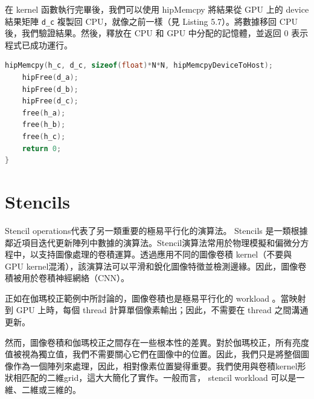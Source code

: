 在 kernel 函數執行完畢後，我們可以使用 hipMemcpy 將結果從 GPU 上的 device 結果矩陣 \texttt{d\_c} 複製回 CPU，就像之前一樣（見 Listing 5.7）。將數據移回 CPU 後，我們驗證結果。然後，釋放在 CPU 和 GPU 中分配的記憶體，並返回 0 表示程式已成功運行。

\lstset{style=mystyle}
\begin{lstlisting}[language=c++,caption={資料傳輸（host到device）和記憶體釋放}]
    hipMemcpy(h_c, d_c, sizeof(float)*N*N, hipMemcpyDeviceToHost);
    hipFree(d_a);
    hipFree(d_b);
    hipFree(d_c);
    free(h_a);
    free(h_b);
    free(h_c);
    return 0;
}
\end{lstlisting}
\section{Stencils}

Stencil operations代表了另一類重要的極易平行化的演算法。 Stencils 是一類根據鄰近項目迭代更新陣列中數據的演算法。Stencil演算法常用於物理模擬和偏微分方程中，以支持圖像處理的卷積運算。透過應用不同的圖像卷積 kernel（不要與 GPU kernel混淆），該演算法可以平滑和銳化圖像特徵並檢測邊緣。因此，圖像卷積被用於卷積神經網絡（CNN）。


正如在伽瑪校正範例中所討論的，圖像卷積也是極易平行化的 workload 。當映射到 GPU 上時，每個 thread 計算單個像素輸出；因此，不需要在 thread 之間溝通更新。


然而，圖像卷積和伽瑪校正之間存在一些根本性的差異。對於伽瑪校正，所有亮度值被視為獨立值，我們不需要關心它們在圖像中的位置。因此，我們只是將整個圖像作為一個陣列來處理，因此，相對像素位置變得重要。我們使用與卷積kernel形狀相匹配的二維grid，這大大簡化了實作。一般而言， stencil workload 可以是一維、二維或三維的。

